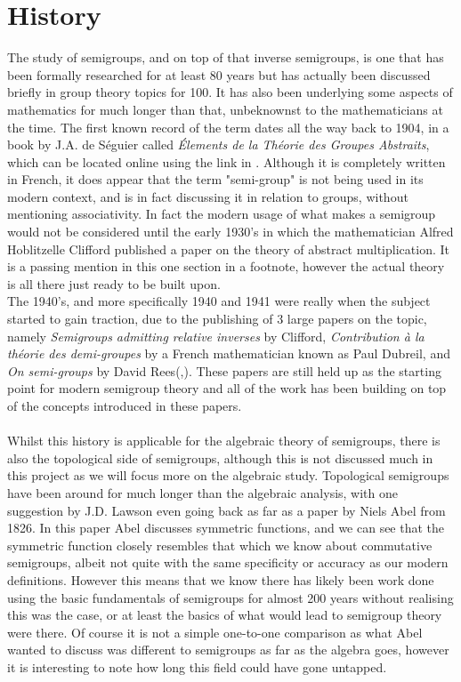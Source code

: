 \documentclass[12pt]{article}
\begin{document}
\section{History}
The study of semigroups, and on top of that inverse semigroups, is one that has been formally researched for at least 80 years but has actually been discussed briefly in group theory topics for 100. It has also been underlying some aspects of mathematics for much longer than that, unbeknownst to the mathematicians at the time. The first known record of the term dates all the way back to 1904, in a book by J.A. de Séguier called \textit{Élements de la Théorie des Groupes Abstraits}\cite{1}, which can be located online using the link in \cite{6}. Although it is completely written in French, it does appear that the term "semi-group" is not being used in its modern context\cite{1}, and is in fact discussing it in relation to groups, without mentioning associativity. In fact the modern usage of what makes a semigroup would not be considered until the early 1930's in which the mathematician Alfred Hoblitzelle Clifford published a paper on the theory of abstract multiplication\cite{7}. It is a passing mention in this one section in a footnote, however the actual theory is all there just ready to be built upon.\\
The 1940's, and more specifically 1940 and 1941 were really when the subject started to gain traction, due to the publishing of 3 large papers on the topic, namely \textit{Semigroups admitting relative inverses} by Clifford, \textit{Contribution \`a la théorie des demi-groupes} by a French mathematician known as Paul Dubreil, and \textit{On semi-groups} by David Rees(\cite{1},\cite{2}). These papers are still held up as the starting point for modern semigroup theory and all of the work has been building on top of the concepts introduced in these papers.\\
\\Whilst this history is applicable for the algebraic theory of semigroups, there is also the topological side of semigroups\cite{2}, although this is not discussed much in this project as we will focus more on the algebraic study. Topological semigroups have been around for much longer than the algebraic analysis, with one suggestion by J.D. Lawson even going back as far as a paper by Niels Abel from 1826\cite{8}. In this paper Abel discusses symmetric functions, and we can see that the symmetric function closely resembles that which we know about commutative semigroups, albeit not quite with the same specificity or accuracy as our modern definitions\cite{8}. However this means that we know there has likely been work done using the basic fundamentals of semigroups for almost 200 years without realising this was the case, or at least the basics of what would lead to semigroup theory were there. Of course it is not a simple one-to-one comparison as what Abel wanted to discuss was different to semigroups as far as the algebra goes, however it is interesting to note how long this field could have gone untapped.\\
\end{document}
